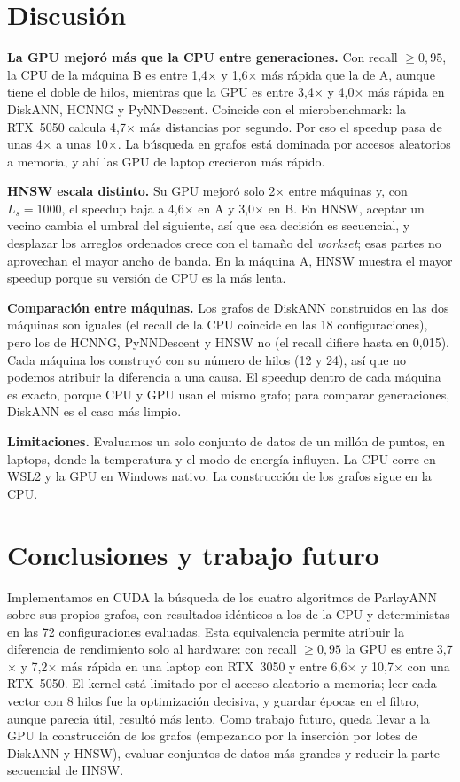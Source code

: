 \documentclass[conference,10pt]{IEEEtran}
\newcommand{\x}{$\times$}
\begin{document}
\section{Discusión}

\textbf{La GPU mejoró más que la CPU entre generaciones.} Con recall $\geq 0{,}95$, la CPU
de la máquina B es entre 1,4\x{} y 1,6\x{} más rápida que la de A, aunque tiene el doble
de hilos, mientras que la GPU es entre 3,4\x{} y 4,0\x{} más rápida en DiskANN, HCNNG y
PyNNDescent. Coincide con el microbenchmark: la RTX~5050 calcula 4,7\x{} más distancias
por segundo. Por eso el speedup pasa de unas 4\x{} a unas 10\x. La búsqueda en grafos está
dominada por accesos aleatorios a memoria, y ahí las GPU de laptop crecieron más rápido.

\textbf{HNSW escala distinto.} Su GPU mejoró solo 2\x{} entre máquinas y, con $L_s=1000$,
el speedup baja a 4,6\x{} en A y 3,0\x{} en B. En HNSW, aceptar un vecino cambia el umbral
del siguiente, así que esa decisión es secuencial, y desplazar los arreglos ordenados
crece con el tamaño del \emph{workset}; esas partes no aprovechan el mayor ancho de banda.
En la máquina A, HNSW muestra el mayor speedup porque su versión de CPU es la más lenta.

\textbf{Comparación entre máquinas.} Los grafos de DiskANN construidos en las dos
máquinas son iguales (el recall de la CPU coincide en las 18 configuraciones), pero los de
HCNNG, PyNNDescent y HNSW no (el recall difiere hasta en 0,015). Cada máquina los
construyó con su número de hilos (12 y 24), así que no podemos atribuir la diferencia a
una causa. El speedup dentro de cada máquina es exacto, porque CPU y GPU usan el mismo
grafo; para comparar generaciones, DiskANN es el caso más limpio.

\textbf{Limitaciones.} Evaluamos un solo conjunto de datos de un millón de puntos, en
laptops, donde la temperatura y el modo de energía influyen. La CPU corre en WSL2 y la GPU
en Windows nativo. La construcción de los grafos sigue en la CPU.

\section{Conclusiones y trabajo futuro}

Implementamos en CUDA la búsqueda de los cuatro algoritmos de ParlayANN sobre sus propios
grafos, con resultados idénticos a los de la CPU y deterministas en las 72 configuraciones
evaluadas. Esta equivalencia permite atribuir la diferencia de rendimiento solo al
hardware: con recall $\geq 0{,}95$ la GPU es entre 3,7\x{} y 7,2\x{} más rápida en una
laptop con RTX~3050 y entre 6,6\x{} y 10,7\x{} con una RTX~5050. El kernel está limitado
por el acceso aleatorio a memoria; leer cada vector con 8 hilos fue la optimización
decisiva, y guardar épocas en el filtro, aunque parecía útil, resultó más lento. Como
trabajo futuro, queda llevar a la GPU la construcción de los grafos (empezando por la
inserción por lotes de DiskANN y HNSW), evaluar conjuntos de datos más grandes y reducir
la parte secuencial de HNSW.

\balance


\end{document}
